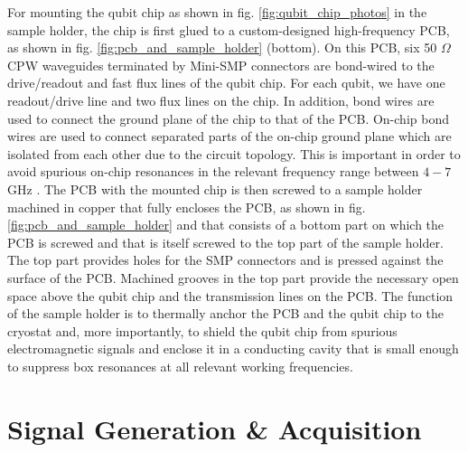 For mounting the qubit chip as shown in fig. \ref{fig:qubit_chip_photos} in the sample holder, the chip is first glued to a custom-designed high-frequency PCB, as shown in fig. \ref{fig:pcb_and_sample_holder} (bottom). On this PCB, six 50 $\Omega$ CPW waveguides terminated by Mini-SMP connectors are bond-wired to the drive/readout and fast flux lines of the qubit chip. For each qubit, we have one readout/drive line and two flux lines on the chip. In addition, bond wires are used to connect the ground plane of the chip to that of the PCB. On-chip bond wires are used to connect separated parts of the on-chip ground plane which are isolated from each other due to the circuit topology. This is important in order to avoid spurious on-chip resonances in the relevant frequency range between $4-7$ GHz \citep{schuster_circuit_2007}. The PCB with the mounted chip is then screwed to a sample holder machined in copper that fully encloses the PCB, as shown in fig. \ref{fig:pcb_and_sample_holder} and that consists of a bottom part on which the PCB is screwed and that is itself screwed to the top part of the sample holder. The top part provides holes for the SMP connectors and is pressed against the surface of the PCB. Machined grooves in the top part provide the necessary open space above the qubit chip and the transmission lines on the PCB. The function of the sample holder is to thermally anchor the PCB and the qubit chip to the cryostat and, more importantly, to shield the qubit chip from spurious electromagnetic signals and enclose it in a conducting cavity that is small enough to suppress box resonances at all relevant working frequencies.

\section{Signal Generation \& Acquisition}

